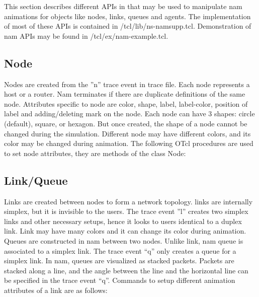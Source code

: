 This section describes different APIs in \ns that may be used to
manipulate nam animations for objects like nodes, links, queues and
agents. 
The implementation of most of these APIs is contained in
\ns/tcl/lib/ns-namsupp.tcl.
Demonstration of nam APIs may be found in \ns/tcl/ex/nam-example.tcl.

\subsection{Node}

Nodes are created from the ''n'' trace event in trace file. 
Each node represents a host or a router. 
Nam terminates if there are duplicate definitions of the same node.
Attributes specific to node are color, shape, label, label-color,
position of label and adding/deleting mark on the node.
Each node can have 3 shapes: circle (default), square, or hexagon.
But once created, the shape of a node cannot be changed during the
simulation.
Different node may have different colors, and its color may be changed
during animation. 
The following OTcl procedures are used to set node attributes, they
are methods of the class Node:


\subsection{Link/Queue}

Links are created between nodes to form a network topology. 
\nam links
are internally simplex, but it is invisible to the users. The trace
event ''l'' creates two simplex links and other necessary setups, hence
it looks to users identical to a duplex link. Link may have many
colors and it can change its color during animation. Queues are
constructed in nam between two nodes. Unlike link, nam queue is
associated to a simplex link.  The trace event ``q'' only creates a
queue for a simplex link. In nam, queues are visualized as stacked
packets. Packets are stacked along a line, and the angle between the
line and the horizontal line can be specified in the trace event ``q''.
Commands to setup different animation attributes of a link are as
follows:

